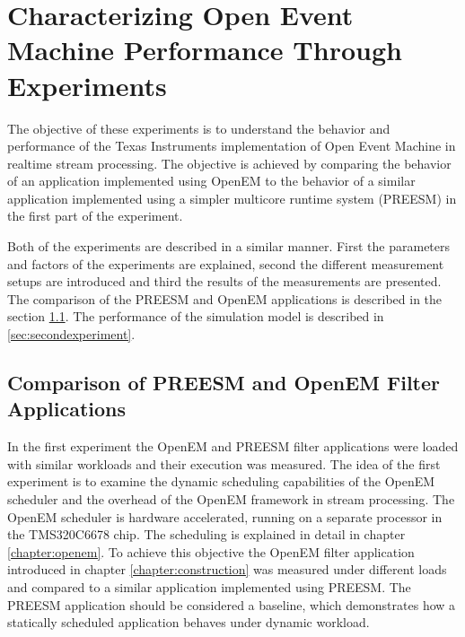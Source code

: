 \chapter [OpenEM Experiments] {Characterizing Open Event Machine Performance Through Experiments}
\label{chapter:experiments}
The objective of these experiments is to understand the behavior and performance of the Texas Instruments implementation of Open Event Machine in realtime stream processing. The objective is achieved by comparing the behavior of an application implemented using OpenEM to the behavior of a similar application implemented using a simpler multicore runtime system (PREESM) in the first part of the experiment. 

Both of the experiments are described in a similar manner. First the parameters and factors of the experiments are explained, second the different measurement setups are introduced and third the results of the measurements are presented.  The comparison of the PREESM and OpenEM applications is described in the section \ref{sec:firstexperiment}. The performance of the simulation model is described in \ref{sec:secondexperiment}.


\section{Comparison of PREESM and OpenEM Filter Applications}
\label{sec:firstexperiment}
In the first experiment the OpenEM and PREESM filter applications were loaded with similar workloads and their execution was measured. The idea of the first experiment is to examine the dynamic scheduling capabilities of the OpenEM scheduler and the overhead of the OpenEM framework in stream processing. The OpenEM scheduler is hardware accelerated, running on a separate processor in the TMS320C6678 chip. The scheduling is explained in detail in chapter \ref{chapter:openem}. To achieve this objective the OpenEM filter application introduced in chapter \ref{chapter:construction} was measured under different loads and compared to a similar application implemented using PREESM. The PREESM application should be considered a baseline, which demonstrates how a statically scheduled application behaves under dynamic workload.

